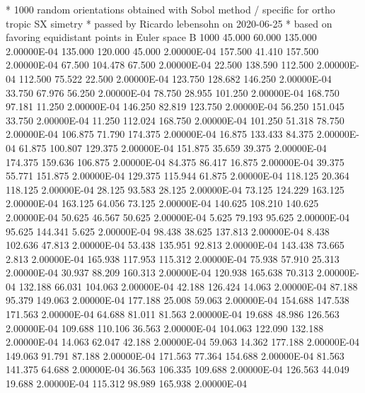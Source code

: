 * 1000 random orientations obtained with Sobol method / specific for ortho tropic SX simetry
* passed by Ricardo lebensohn on 2020-06-25
* based on favoring equidistant points in Euler space
B   1000
    45.000    60.000   135.000  2.00000E-04
   135.000   120.000    45.000  2.00000E-04
   157.500    41.410   157.500  2.00000E-04
    67.500   104.478    67.500  2.00000E-04
    22.500   138.590   112.500  2.00000E-04
   112.500    75.522    22.500  2.00000E-04
   123.750   128.682   146.250  2.00000E-04
    33.750    67.976    56.250  2.00000E-04
    78.750    28.955   101.250  2.00000E-04
   168.750    97.181    11.250  2.00000E-04
   146.250    82.819   123.750  2.00000E-04
    56.250   151.045    33.750  2.00000E-04
    11.250   112.024   168.750  2.00000E-04
   101.250    51.318    78.750  2.00000E-04
   106.875    71.790   174.375  2.00000E-04
    16.875   133.433    84.375  2.00000E-04
    61.875   100.807   129.375  2.00000E-04
   151.875    35.659    39.375  2.00000E-04
   174.375   159.636   106.875  2.00000E-04
    84.375    86.417    16.875  2.00000E-04
    39.375    55.771   151.875  2.00000E-04
   129.375   115.944    61.875  2.00000E-04
   118.125    20.364   118.125  2.00000E-04
    28.125    93.583    28.125  2.00000E-04
    73.125   124.229   163.125  2.00000E-04
   163.125    64.056    73.125  2.00000E-04
   140.625   108.210   140.625  2.00000E-04
    50.625    46.567    50.625  2.00000E-04
     5.625    79.193    95.625  2.00000E-04
    95.625   144.341     5.625  2.00000E-04
    98.438    38.625   137.813  2.00000E-04
     8.438   102.636    47.813  2.00000E-04
    53.438   135.951    92.813  2.00000E-04
   143.438    73.665     2.813  2.00000E-04
   165.938   117.953   115.312  2.00000E-04
    75.938    57.910    25.313  2.00000E-04
    30.937    88.209   160.313  2.00000E-04
   120.938   165.638    70.313  2.00000E-04
   132.188    66.031   104.063  2.00000E-04
    42.188   126.424    14.063  2.00000E-04
    87.188    95.379   149.063  2.00000E-04
   177.188    25.008    59.063  2.00000E-04
   154.688   147.538   171.563  2.00000E-04
    64.688    81.011    81.563  2.00000E-04
    19.688    48.986   126.563  2.00000E-04
   109.688   110.106    36.563  2.00000E-04
   104.063   122.090   132.188  2.00000E-04
    14.063    62.047    42.188  2.00000E-04
    59.063    14.362   177.188  2.00000E-04
   149.063    91.791    87.188  2.00000E-04
   171.563    77.364   154.688  2.00000E-04
    81.563   141.375    64.688  2.00000E-04
    36.563   106.335   109.688  2.00000E-04
   126.563    44.049    19.688  2.00000E-04
   115.312    98.989   165.938  2.00000E-04
